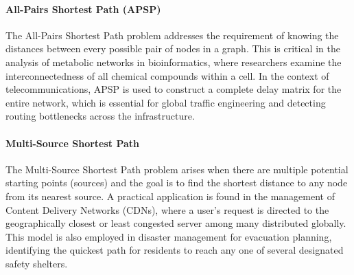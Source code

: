 \paragraph{All-Pairs Shortest Path (APSP)}
The All-Pairs Shortest Path problem addresses the requirement of knowing the distances between every possible pair of nodes in a graph. This is critical in the analysis of metabolic networks in bioinformatics, where researchers examine the interconnectedness of all chemical compounds within a cell. In the context of telecommunications, APSP is used to construct a complete delay matrix for the entire network, which is essential for global traffic engineering and detecting routing bottlenecks across the infrastructure.

\paragraph{Multi-Source Shortest Path}
The Multi-Source Shortest Path problem arises when there are multiple potential starting points (sources) and the goal is to find the shortest distance to any node from its nearest source. A practical application is found in the management of Content Delivery Networks (CDNs), where a user's request is directed to the geographically closest or least congested server among many distributed globally. This model is also employed in disaster management for evacuation planning, identifying the quickest path for residents to reach any one of several designated safety shelters.